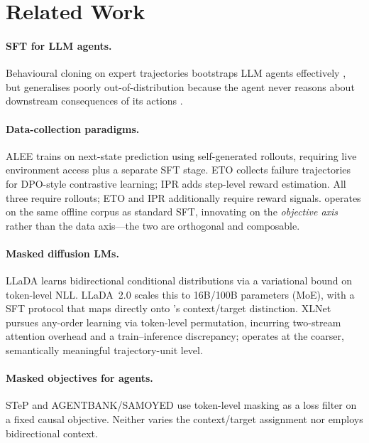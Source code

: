 \section{Related Work}
\label{sec:related}

\paragraph{SFT for LLM agents.}
Behavioural cloning on expert trajectories bootstraps LLM agents effectively
\citep{yao2022webshop,deng2023mind2web,zeng2023agenttuning,hong2024cogagent},
but generalises poorly out-of-distribution because the agent never reasons about
downstream consequences of its actions \citep{chu2025sft}.

\paragraph{Data-collection paradigms.}
ALEE \citep{zhang2025alee} trains on next-state prediction using self-generated
rollouts, requiring live environment access plus a separate SFT stage.
ETO \citep{song2024eto} collects failure trajectories for DPO-style contrastive
learning; IPR \citep{zhang2024ipr} adds step-level reward estimation.
All three require rollouts; ETO and IPR additionally require reward signals.
\aomt{} operates on the same offline corpus as standard SFT, innovating on the
\emph{objective axis} rather than the data axis---the two are orthogonal and
composable.

\paragraph{Masked diffusion LMs.}
LLaDA \citep{nie2025llada} learns bidirectional conditional distributions
via a variational bound on token-level NLL.
LLaDA~2.0 \citep{bie2025llada20} scales this to 16B/100B parameters (MoE),
with a SFT protocol that maps directly onto \aomt{}'s context/target distinction.
XLNet \citep{yang2019xlnet} pursues any-order learning via token-level permutation,
incurring two-stream attention overhead and a train--inference discrepancy;
\aomt{} operates at the coarser, semantically meaningful trajectory-unit level.

\paragraph{Masked objectives for agents.}
STeP \citep{chen2023step} and AGENTBANK/SAMOYED \citep{zeng2023agenttuning}
use token-level masking as a loss filter on a fixed causal objective.
Neither varies the context/target assignment nor employs bidirectional context.
